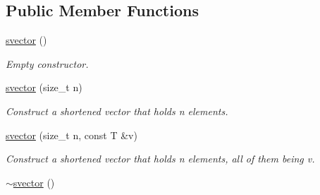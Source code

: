 \subsection*{Public Member Functions}
\begin{DoxyCompactItemize}
\item 
\hypertarget{classlgraph_1_1utils_1_1svector_ae2587ed7933a70b8367e178dd61f90f9}{\hyperlink{classlgraph_1_1utils_1_1svector_ae2587ed7933a70b8367e178dd61f90f9}{svector} ()}\label{classlgraph_1_1utils_1_1svector_ae2587ed7933a70b8367e178dd61f90f9}

\begin{DoxyCompactList}\small\item\em Empty constructor. \end{DoxyCompactList}\item 
\hypertarget{classlgraph_1_1utils_1_1svector_aae71cfdb8e4d66c25a255b4a6bc7ad1c}{\hyperlink{classlgraph_1_1utils_1_1svector_aae71cfdb8e4d66c25a255b4a6bc7ad1c}{svector} (size\-\_\-t n)}\label{classlgraph_1_1utils_1_1svector_aae71cfdb8e4d66c25a255b4a6bc7ad1c}

\begin{DoxyCompactList}\small\item\em Construct a shortened vector that holds {\itshape n} elements. \end{DoxyCompactList}\item 
\hypertarget{classlgraph_1_1utils_1_1svector_a350de4ad59381c976905881480b0ed05}{\hyperlink{classlgraph_1_1utils_1_1svector_a350de4ad59381c976905881480b0ed05}{svector} (size\-\_\-t n, const T \&v)}\label{classlgraph_1_1utils_1_1svector_a350de4ad59381c976905881480b0ed05}

\begin{DoxyCompactList}\small\item\em Construct a shortened vector that holds {\itshape n} elements, all of them being {\itshape v}. \end{DoxyCompactList}\item 
\hypertarget{classlgraph_1_1utils_1_1svector_a32558a0ffa1a78f192d4294e37922cbe}{\hyperlink{classlgraph_1_1utils_1_1svector_a32558a0ffa1a78f192d4294e37922cbe}{$\sim$svector} ()}\label{classlgraph_1_1utils_1_1svector_a32558a0ffa1a78f192d4294e37922cbe}


\end{DoxyCompactItemize}
